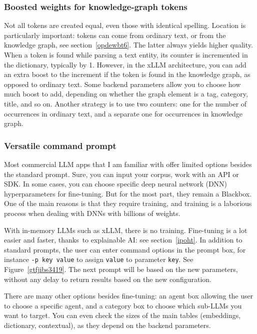 \documentclass[10pt]{article}
\begin{document}
{\subsubsection{Boosted weights for knowledge-graph tokens}

Not all tokens are created equal, even those with identical spelling. Location is particularly important: tokens can come from ordinary text, or from the knowledge graph, see section~\ref{opdewbt6}. The latter always yields higher quality. 
When a token is found while parsing a text entity, its counter is incremented in the dictionary, typically by 1. However, in the xLLM 
 architecture, you can add an extra boost to the increment if the token is found in the knowledge graph, as opposed to ordinary text.
Some backend parameters allow you to choose how much boost to add, depending on whether the graph element is a tag, 
category, title, and so on. Another strategy is to use two counters: one for the number of occurrences in ordinary text, 
 and a separate one for occurrences in knowledge graph. 
 

\subsubsection{Versatile command prompt}

Most commercial LLM apps that I am familiar with offer limited options besides the standard prompt. Sure, you can input your corpus, 
work with an API or SDK. In some cases, you can choose specific deep neural network (DNN) hyperparameters for fine-tuning. But for the most part, they remain a Blackbox. One of the main reasons is that they require training, and training is a laborious process when 
 dealing with DNNs with billions of weights.

With in-memory LLMs such as xLLM, there is no training. Fine-tuning is a lot easier and faster, thanks~to explainable AI: see section~\ref{ipoht}.
In addition to standard prompts, the user can enter command options in the prompt box, for instance \texttt{-p key value} to 
assign \texttt{value} to parameter \texttt{key}. See Figure~\ref{gtfjibs3419}. The next prompt will be based on the new
parameters, without any delay to return results based on the new configuration.

There are many other options besides fine-tuning: an agent box
 allowing the user to choose a specific agent, and a category box to choose which sub-LLMs you want to target. You can even check the sizes of the main tables (embeddings, dictionary, contextual), as they depend on the backend parameters.

}
\end{document}
